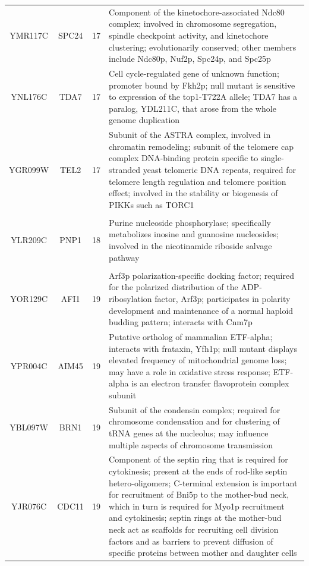 \documentclass[]{article}
\begin{document}
\begin{longtable}{@{\extracolsep{3pt}} cccp{85mm}}
YMR117C & SPC24 & 17 & Component of the kinetochore-associated Ndc80 complex; involved in chromosome segregation, spindle checkpoint activity, and kinetochore clustering; evolutionarily conserved; other members include Ndc80p, Nuf2p, Spc24p, and Spc25p \\ 
YNL176C & TDA7 & 17 & Cell cycle-regulated gene of unknown function; promoter bound by Fkh2p; null mutant is sensitive to expression of the top1-T722A allele; TDA7 has a paralog, YDL211C, that arose from the whole genome duplication \\ 
YGR099W & TEL2 & 17 & Subunit of the ASTRA complex, involved in chromatin remodeling; subunit of the telomere cap complex DNA-binding protein specific to single-stranded yeast telomeric DNA repeats, required for telomere length regulation and telomere position effect; involved in the stability or biogenesis of PIKKs such as TORC1 \\   \hline \\ [-1.8ex] 
YLR209C & PNP1 & 18 & Purine nucleoside phosphorylase; specifically metabolizes inosine and guanosine nucleosides; involved in the nicotinamide riboside salvage pathway \\   \hline \\ [-1.8ex] 
YOR129C & AFI1 & 19 & Arf3p polarization-specific docking factor; required for the polarized distribution of the ADP-ribosylation factor, Arf3p; participates in polarity development and maintenance of a normal haploid budding pattern; interacts with Cnm7p \\ 
YPR004C & AIM45 & 19 & Putative ortholog of mammalian ETF-alpha; interacts with frataxin, Yfh1p; null mutant displays elevated frequency of mitochondrial genome loss; may have a role in oxidative stress response; ETF-alpha is an electron transfer flavoprotein complex subunit \\ 
YBL097W & BRN1 & 19 & Subunit of the condensin complex; required for chromosome condensation and for clustering of tRNA genes at the nucleolus; may influence multiple aspects of chromosome transmission \\ 
YJR076C & CDC11 & 19 & Component of the septin ring that is required for cytokinesis; present at the ends of rod-like septin hetero-oligomers; C-terminal extension is important for recruitment of Bni5p to the mother-bud neck, which in turn is required for Myo1p recruitment and cytokinesis; septin rings at the mother-bud neck act as scaffolds for recruiting cell division factors and as barriers to prevent diffusion of specific proteins between mother and daughter cells \\ 

\end{longtable}
\end{document}
